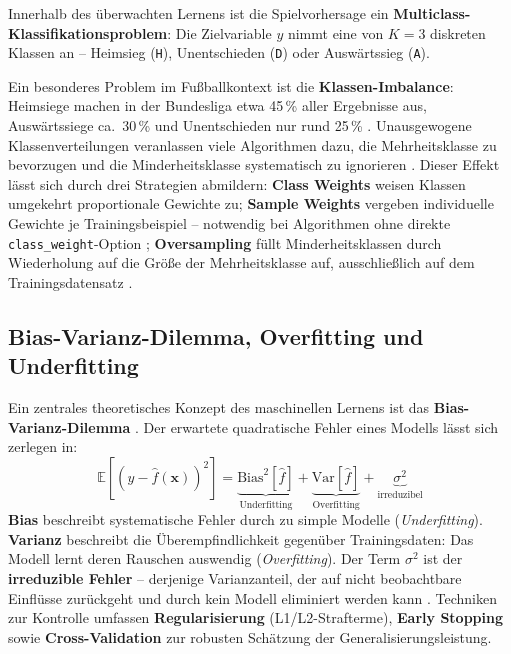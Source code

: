 Innerhalb des überwachten Lernens ist die Spielvorhersage ein
\textbf{Multiclass-Klassifikationsproblem}: Die Zielvariable $y$ nimmt
eine von $K = 3$ diskreten Klassen an -- Heimsieg (\texttt{H}),
Unentschieden (\texttt{D}) oder Auswärtssieg (\texttt{A}).

Ein besonderes Problem im Fußballkontext ist die \textbf{Klassen-Imbalance}:
Heimsiege machen in der Bundesliga etwa 45\,\% aller Ergebnisse aus,
Auswärtssiege ca.\ 30\,\% und Unentschieden nur rund 25\,\% \cite{HeGarcia2009}.
Unausgewogene Klassenverteilungen veranlassen viele Algorithmen dazu, die
Mehrheitsklasse zu bevorzugen und die Minderheitsklasse systematisch zu
ignorieren \cite{JapkowiczStephen2002}. Dieser Effekt lässt sich durch
drei Strategien abmildern: \textbf{Class Weights} weisen Klassen umgekehrt
proportionale Gewichte zu; \textbf{Sample Weights} vergeben individuelle
Gewichte je Trainingsbeispiel -- notwendig bei Algorithmen ohne direkte
\texttt{class\_weight}-Option \cite{ScikitLearn2024}; \textbf{Oversampling}
füllt Minderheitsklassen durch Wiederholung auf die Größe der Mehrheitsklasse
auf, ausschließlich auf dem Trainingsdatensatz \cite{ChawlaEtAl2002}.

\subsection{Bias-Varianz-Dilemma, Overfitting und Underfitting}

Ein zentrales theoretisches Konzept des maschinellen Lernens ist das
\textbf{Bias-Varianz-Dilemma} \cite{GemanEtAl1992}. Der erwartete
quadratische Fehler eines Modells lässt sich zerlegen in:
\begin{equation}
    \mathbb{E}[(y - \hat{f}(\mathbf{x}))^2]
    = \underbrace{\text{Bias}^2[\hat{f}]}_{\text{Underfitting}}
    + \underbrace{\text{Var}[\hat{f}]}_{\text{Overfitting}}
    + \underbrace{\sigma^2}_{\text{irreduzibel}}
\end{equation}
\textbf{Bias} beschreibt systematische Fehler durch zu simple Modelle
(\textit{Underfitting}). \textbf{Varianz} beschreibt die Überempfindlichkeit
gegenüber Trainingsdaten: Das Modell lernt deren Rauschen auswendig
(\textit{Overfitting}). Der Term $\sigma^2$ ist der \textbf{irreduzible
Fehler} -- derjenige Varianzanteil, der auf nicht beobachtbare Einflüsse
zurückgeht und durch kein Modell eliminiert werden kann \cite{JamesEtAl2021}.
Techniken zur Kontrolle umfassen \textbf{Regularisierung} (L1/L2-Strafterme),
\textbf{Early Stopping} \cite{GoodfellowEtAl2016} sowie
\textbf{Cross-Validation} zur robusten Schätzung der Generalisierungsleistung.

